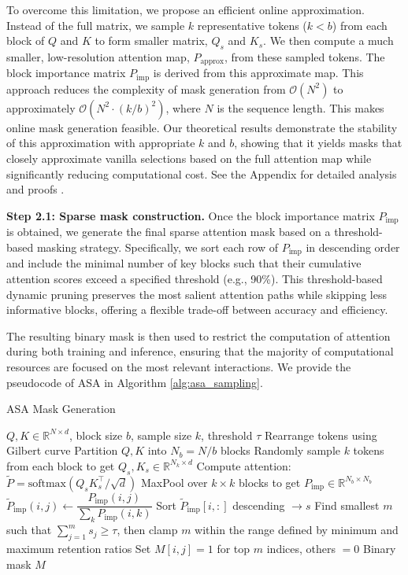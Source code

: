 \documentclass[letterpaper]{article} %
\begin{document}
To overcome this limitation, we propose an efficient online approximation. Instead of the full matrix, we sample $k$ representative tokens ($k < b$) from each block of $Q$ and $K$ to form smaller matrix, $Q_s$ and $K_s$. We then compute a much smaller, low-resolution attention map, $P_{\text{approx}}$, from these sampled tokens. The block importance matrix $P_{\text{imp}}$ is derived from this approximate map. This approach reduces the complexity of mask generation from $\mathcal{O}(N^2)$ to approximately $\mathcal{O}(N^2 \cdot (k/b)^2)$, where $N$ is the sequence length. This makes online mask generation feasible. Our theoretical results demonstrate the stability of this approximation with appropriate $k$ and $b$, showing that it yields masks that closely approximate vanilla selections based on the full attention map while significantly reducing computational cost. See the Appendix for detailed analysis and proofs \cite{oneill2023distributionorderstatisticssampling}.


\textbf{Step 2.1: Sparse mask construction.}
Once the block importance matrix $P_{\text{imp}}$ is obtained, we generate the final sparse attention mask based on a threshold-based masking strategy. %
Specifically, we sort each row of $P_{\text{imp}}$ in descending order and include the minimal number of key blocks such that their cumulative attention scores exceed a specified threshold (e.g., 90\%). This threshold-based dynamic pruning preserves the most salient attention paths while skipping less informative blocks, offering a flexible trade-off between accuracy and efficiency.

The resulting binary mask is then used to restrict the computation of attention during both training and inference, ensuring that the majority of computational resources are focused on the most relevant interactions.
We provide the pseudocode of ASA in Algorithm \ref{alg:asa_sampling}. 
\begin{algorithm}[H]
\caption{ASA Mask Generation}
\label{alg:asa_sampling}
\begin{algorithmic}[1]
\REQUIRE $Q, K \in \mathbb{R}^{N \times d}$, block size $b$, sample size $k$, threshold $\tau$
\STATE Rearrange tokens using Gilbert curve
\STATE Partition $Q, K$ into $N_b = N / b$ blocks
\STATE Randomly sample $k$ tokens from each block to get $Q_s, K_s \in \mathbb{R}^{N_k \times d}$
\STATE Compute attention: $\widetilde{P} = \text{softmax}(Q_s K_s^\top / \sqrt{d})$
\STATE MaxPool over $k \times k$ blocks to get $P_{\text{imp}} \in \mathbb{R}^{N_b \times N_b}$
    \STATE $\tilde{P}_{\text{imp}}(i,j) \gets \dfrac{P_{\text{imp}}(i,j)}{\sum_k P_{\text{imp}}(i,k)}$
    \STATE Sort $\tilde{P}_{\text{imp}}[i,:]$ descending $\rightarrow s$
    \STATE Find smallest $m$ such that $\sum_{j=1}^{m} s_j \geq \tau$, then clamp $m$ within the range defined by minimum and maximum retention ratios
    \STATE Set $M[i,j] = 1$ for top $m$ indices, others $= 0$
\ENDFOR
\RETURN Binary mask $M$
\end{algorithmic}
\end{algorithm}
\end{document}
